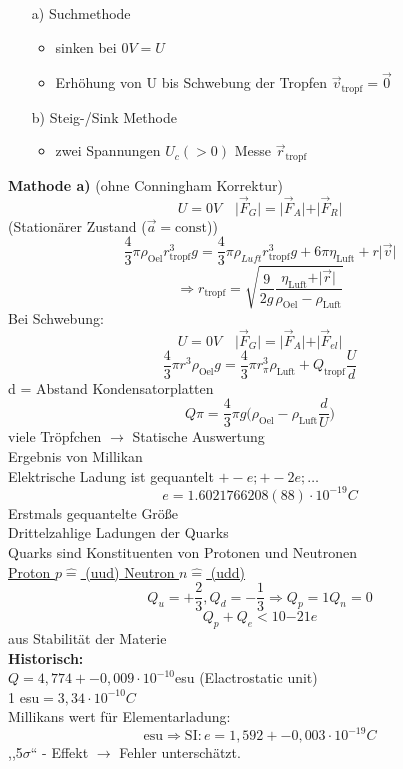 \documentclass[titlepage,12pt,a4paper,ngerman]{report}
\newcommand{\tx}[1]{\textrm{#1}}
\begin{document}
\begin{itemize}
\item[a)] Suchmethode
\begin{itemize}
\item sinken bei $0V= U$
\item Erhöhung von U bis Schwebung der Tropfen $\vec{v}_{\textrm{tropf}} = \vec{0}$
\end{itemize}
\item[b)] Steig-/Sink Methode
\begin{itemize}
\item zwei Spannungen $U_c(>0)$ Messe $\vec{r}_{\tx{tropf}}$
\end{itemize}
\end{itemize}
\textbf{Mathode a)} (ohne Conningham Korrektur)\\
$$U = 0V \quad \vert \vec{F}_G \vert = \vert \vec{F}_A \vert + \vert \vec{F}_R \vert$$ (Stationärer Zustand ($\vec{a} = \tx{const}$))
$$\frac{4}{3} \pi \rho_{\tx{Oel}} r^3_{\tx{tropf}} g = \frac{4}{3} \pi \rho_{Luft} r_{\tx{tropf}}^3 g + 6 \pi \eta_{\tx{Luft}} + r \vert \vec{v} \vert$$
$$\Rightarrow r_{\tx{tropf}} = \sqrt{\frac{9}{2g} \frac{\eta_{\tx{Luft}} + \vert \vec{r} \vert }{\rho_{\tx{Oel}}-\rho_{\tx{Luft}}}}$$
Bei Schwebung:
$$U = 0V \quad \vert \vec{F}_G \vert = \vert \vec{F}_A \vert + \vert \vec{F}_{el} \vert$$
$$\frac{4}{3} \pi r^3 \rho_{\tx{Oel}} g = \frac{4}{3} \pi r^3_{\pi} \rho_{\tx{Luft}} + Q_{\tx{tropf}} \frac{U}{d}$$
 d = Abstand Kondensatorplatten
$$Q\pi = \frac{4}{3}	\pi g  \bigg( \rho_{\tx{Oel}}-\rho_{\tx{Luft}} \frac{d}{U}\bigg)$$
viele Tröpfchen $\rightarrow$ Statische Auswertung\\
Ergebnis von Millikan \\%
Elektrische Ladung ist gequantelt $+- e;+-2e;\dots$
$$e = 1.6021766208(88) \cdot 10^{-19} C$$
Erstmals gequantelte Größe\\
Drittelzahlige Ladungen der Quarks\\
Quarks sind Konstituenten von Protonen und Neutronen\\
\underline{Proton $p \widehat{=}$ (uud) Neutron $n \widehat{=} $ (udd)}
$$Q_u = + \frac{2}{3}, Q_d = - \frac{1}{3} \Rightarrow Q_p = 1 Q_n = 0$$
$$Q_p + Q_e < 10{-21} e$$ aus Stabilität der Materie\\
\textbf{Historisch:}\\
$Q = 4,774 +- 0,009 \cdot 10^{-10}$esu (Elactrostatic unit)\\
1 esu$ = 3,34 \cdot 10^{-10} C$\\
Millikans wert für Elementarladung: $$ \textrm{esu} \Rightarrow \textrm{SI}: e = 1,592 +- 0,003 \cdot 10 ^{-19} C$$
,,5$\sigma$`` - Effekt $\rightarrow$ Fehler unterschätzt.
\end{document}
